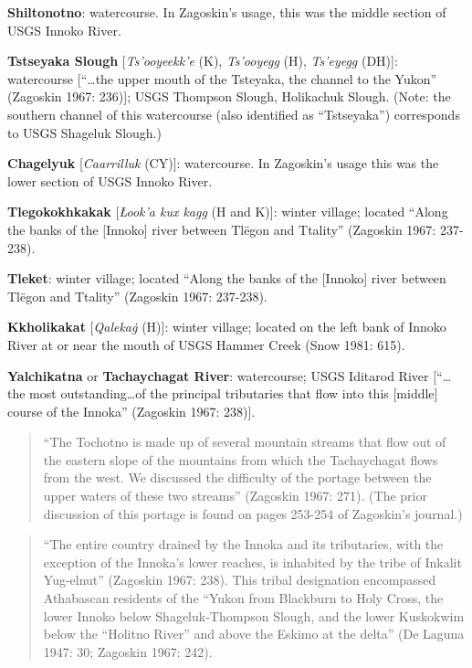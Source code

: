 \begin{hang}
\textbf{Shiltonotno}: watercourse. In Zagoskin’s usage, this was the middle section of USGS Innoko River.



\textbf{Tstseyaka Slough} [\textit{Ts’ooyeekk’e} (K), \textit{Ts’ooyegg} (H), \textit{Ts’eyegg} (DH)]: watercourse [``…the upper mouth of the Tsteyaka, the channel to the Yukon” (Zagoskin 1967: 236)]; USGS Thompson Slough, Holikachuk Slough. (Note: the southern channel of this watercourse (also identified as “Tstseyaka”) corresponds to USGS Shageluk Slough.)



\textbf{Chagelyuk} [\textit{Caarrilluk} (CY)]: watercourse. In Zagoskin’s usage this was the lower section of USGS Innoko River.



\textbf{Tlegokokhkakak} [\textit{Łook’a kux kagg} (H and K)]: winter village; located “Along the banks of the [Innoko] river between Tlëgon and Ttality” (Zagoskin 1967: 237-238).



\textbf{Tleket}: winter village; located “Along the banks of the [Innoko] river between Tlëgon and Ttality” (Zagoskin 1967: 237-238).



\textbf{Kkholikakat} [\textit{Qaleka\.g} (H)]: winter village; located on the left bank of Innoko River at or near the mouth of USGS Hammer Creek (Snow 1981: 615).



\textbf{Yalchikatna} or \textbf{Tachaychagat River}: watercourse; USGS Iditarod River [“…the most outstanding…of the principal tributaries that flow into this [middle] course of the Innoka” (Zagoskin 1967: 238)].



\begin{quote}“The Tochotno is made up of several mountain streams that flow out of the eastern slope of the mountains from which the Tachaychagat flows from the west. We discussed the difficulty of the portage between the upper waters of these two streams” (Zagoskin 1967: 271). (The prior discussion of this portage is found on pages 253-254 of Zagoskin’s journal.)
\end{quote}



\begin{quote}“The entire country drained by the Innoka and its tributaries, with the exception of the Innoka’s lower reaches, is inhabited by the tribe of Inkalit Yug-elnut” (Zagoskin 1967: 238). This tribal designation encompassed Athabascan residents of the “Yukon from Blackburn to Holy Cross, the lower Innoko below Shageluk-Thompson Slough, and the lower Kuskokwim below the “Holitno River” and above the Eskimo at the delta” (De Laguna 1947: 30; Zagoskin 1967: 242).
\end{quote}




\end{hang}
